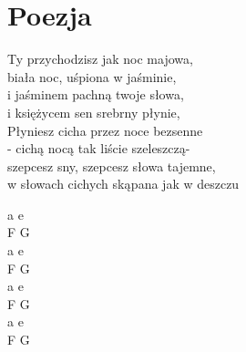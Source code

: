 \section{Poezja}
\begin{minipage}{\dimexpr.4\textwidth-.4\columnsep}
    \noindent Ty przychodzisz jak noc majowa,\\
    biała noc, uśpiona w jaśminie,\\
    i jaśminem pachną twoje słowa,\\
    i księżycem sen srebrny płynie,\\
    \hfill\break
    Płyniesz cicha przez noce bezsenne\\
    - cichą nocą tak liście szeleszczą-\\
    szepcesz sny, szepcesz słowa tajemne,\\
    w słowach cichych skąpana jak w deszczu\\
\end{minipage}
\hfill
\begin{minipage}{\dimexpr.05\textwidth-.05\columnsep}
    \ifchorded
    \noindent a e\\
    F G\\
    a e\\
    F G\\
    \hfill\break
    a e\\
    F G\\
    a e\\
    F G\\
    \else
    \fi
\end{minipage}
